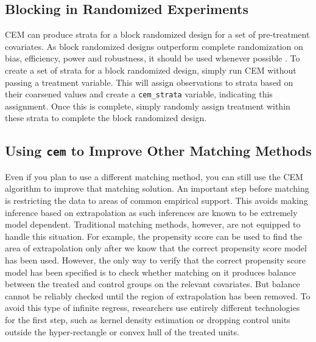 \documentclass[11pt,titlepage]{article}
\begin{document}





\subsection{Blocking in Randomized Experiments} 

CEM can produce strata for a block randomized design for a set of
pre-treatment covariates. As block randomized designs outperform complete
randomization on bias, efficiency, power and robustness, it should be used
whenever possible \citep{ImaKinNal09,ImaKinStu08}. To create a set of
strata for a block randomized design, simply run CEM without passing a
treatment variable. This will assign observations to strata based on their
coarsened values and create a \texttt{cem\_strata} variable, indicating
this assignment. Once this is complete, simply randomly assign treatment
within these strata to complete the block randomized design.

\subsection{Using \texttt{cem} to Improve Other Matching Methods}

Even if you plan to use a different matching method, you can still use the
CEM algorithm to improve that matching solution. An important step before
matching is restricting the data to areas of common empirical support.
This avoids making inference based on extrapolation as such inferences are
known to be extremely model dependent. Traditional matching methods, however,
are not equipped to handle this situation. For example, the propensity
score can be used to find the area of extrapolation only after we know
that the correct propensity score model has been used.  However, the only
way to verify that the correct propensity score model has been specified
is to check whether matching on it produces balance between the treated
and control groups on the relevant covariates.  But balance cannot be
reliably checked until the region of extrapolation has been removed.  To
avoid this type of infinite regress, researchers use entirely different
technologies for the first step, such as kernel density estimation
\citep{HecIchTod98} or dropping control units outside the hyper-rectangle
\citep{IacPor08} or convex hull \citep{KinZen06} of the treated units.
\end{document}
